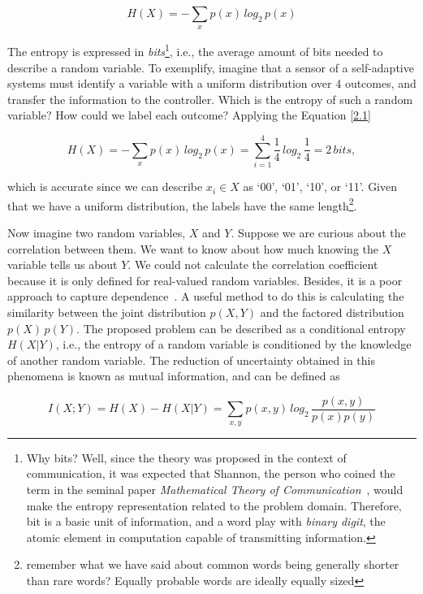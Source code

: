 \begin{equation}
\label{2.1}
H(X)=-\sum_{x}p(x)\,log_{2}\,p(x)
\end{equation}

The entropy is expressed in \textit{bits}\footnote{Why bits? Well, since the theory was proposed in the context of communication, it was expected that Shannon, the person who coined the term in the seminal paper \textit{Mathematical Theory of Communication}~\cite{shannon1948mathematical}, would make the entropy representation related to the problem domain. Therefore, bit is a basic unit of information, and a word play with \textit{binary digit}, the atomic element in computation capable of transmitting information.}, i.e., the average amount of bits needed to describe a random variable. To exemplify, imagine that a sensor of a self-adaptive systems must identify a variable with a uniform distribution over 4 outcomes, and transfer the information to the controller. Which is the entropy of such a random variable? How could we label each outcome? Applying the Equation \ref{2.1}

\begin{equation}
H(X)=-\sum_{x} p(x)\,log_{2}\,p(x)=\sum_{i=1}^4 \frac{1}{4}\,log_{2}\,\frac{1}{4}=2\,bits,
\end{equation}

\noindent
which is accurate since we can describe $x_i \in X$ as `00', `01', `10', or `11'. Given that we have a uniform distribution, the labels have the same length\footnote{remember what we have said about common words being generally shorter than rare words? Equally probable words are ideally equally sized}.

Now imagine two random variables, $X$ and $Y$. Suppose we are curious about the correlation between them. We want to know about how much knowing the $X$ variable tells us about $Y$. We could not calculate the correlation coefficient because it is only defined for real-valued random variables. Besides, it is a poor approach to capture dependence~\cite{robert2014machine}. A useful method to do this is calculating the similarity between the joint distribution $p(X, Y)$ and the factored distribution $p(X)\,p(Y)$. The proposed problem can be described as a conditional entropy $H(X|Y)$, i.e., the entropy of a random variable is conditioned by the knowledge of another random variable. The reduction of uncertainty obtained in this phenomena is known as mutual information, and can be defined as

\begin{equation}
I(X; Y) = H(X) - H(X|Y) = \sum_{x,y} p(x,y)\,log_{2}\,\frac{p(x,y)}{p(x)p(y)}
\end{equation}

